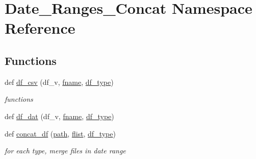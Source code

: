 \hypertarget{namespace_date___ranges___concat}{}\section{Date\+\_\+\+Ranges\+\_\+\+Concat Namespace Reference}
\label{namespace_date___ranges___concat}
\subsection*{Functions}
\begin{DoxyCompactItemize}
\item 
def \hyperlink{namespace_date___ranges___concat_a8b2e1361ac52e49222b980f9de7b7eee}{df\+\_\+csv} (df\+\_\+v, \hyperlink{namespace_date___ranges___concat_a86701c1e83bc108fd48d569692baf90a}{fname}, \hyperlink{namespace_date___ranges___concat_a34d743f3f351e0c5fdce2c21586a234d}{df\+\_\+type})
\begin{DoxyCompactList}\small\item\em functions \end{DoxyCompactList}\item 
def \hyperlink{namespace_date___ranges___concat_a676b5f62783a3f828eb2e89a23f5f031}{df\+\_\+dat} (df\+\_\+v, \hyperlink{namespace_date___ranges___concat_a86701c1e83bc108fd48d569692baf90a}{fname}, \hyperlink{namespace_date___ranges___concat_a34d743f3f351e0c5fdce2c21586a234d}{df\+\_\+type})
\item 
def \hyperlink{namespace_date___ranges___concat_af59a5254a569d9161e71627efb4aaf30}{concat\+\_\+df} (\hyperlink{namespace_date___ranges___concat_a2b3a66331b773dfcae06fbf3e0426bc8}{path}, \hyperlink{namespace_date___ranges___concat_ac0724de24e84d20872e1d08a28a73fac}{flist}, \hyperlink{namespace_date___ranges___concat_a34d743f3f351e0c5fdce2c21586a234d}{df\+\_\+type})
\begin{DoxyCompactList}\small\item\em for each type, merge files in date range \end{DoxyCompactList}\end{DoxyCompactItemize}
